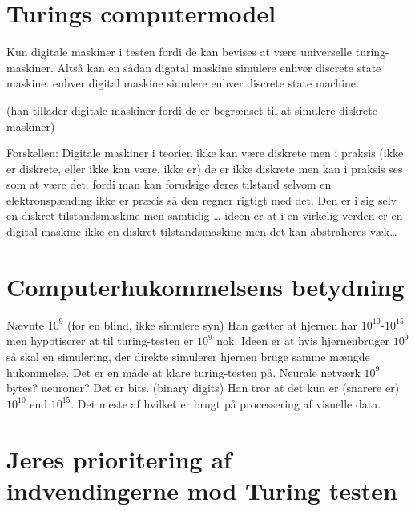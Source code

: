 \documentclass{article}
\author{Mikkel Kragh Mathiesen, Jannik Gram, Rune \& Rasmus Abrahams{\tt (son|en)}}
\title{}
\date{\today}
\begin{document}
\maketitle
\section{Turings computermodel}
Kun digitale maskiner i testen fordi de kan bevises at være universelle turing-maskiner.
Altså kan en sådan digatal maskine simulere enhver discrete state maskine.
enhver digital maskine simulere enhver discrete state machine.

(han tillader digitale maskiner fordi de er begrænset til at simulere diskrete maskiner)

Forskellen: Digitale maskiner i teorien ikke kan være diskrete men i praksis (ikke er diskrete, eller ikke kan være, ikke er) de er ikke diskrete men kan i praksis ses som at være det. fordi man kan forudsige deres tilstand selvom en elektronspænding ikke er præcis så den regner rigtigt med det.
Den er i sig selv en diskret tilstandsmaskine men samtidig … ideen er at i en virkelig verden er en digital maskine ikke en  diskret tilstandsmaskine men det kan abstraheres væk…

\section{Computerhukommelsens betydning}
Nævnte $10^9$ (for en blind, ikke simulere syn)
Han gætter at hjernen har $10^{10}$-$10^{15}$ men hypotiserer at til turing-testen er $10^9$ nok.
Ideen er at hvis hjernenbruger $10^9$ så skal en simulering, der direkte simulerer hjernen bruge samme mængde hukommelse. Det er en måde at klare turing-testen på.
Neurale netværk
$10^9$ bytes? neuroner? Det er bits. (binary digits)
Han tror at det kun er (snarere er) $10^{10}$ end $10^{15}$.
Det meste af hvilket er brugt på processering af visuelle data.

\section{Jeres prioritering af indvendingerne mod Turing testen}
\end{document}
